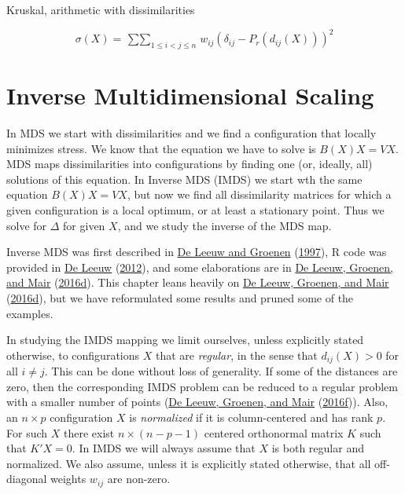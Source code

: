 \documentclass[
  12pt,
]{book}
\theoremstyle{definition}
\theoremstyle{definition}
\theoremstyle{definition}
\theoremstyle{definition}
\theoremstyle{remark}
\begin{document}
Kruskal, arithmetic with dissimilarities

\[
\sigma(X)=\mathop{\sum\sum}_{1\leq i<j\leq n}w_{ij}(\delta_{ij}-P_r(d_{ij}(X)))^2
\]

\hypertarget{inverse-multidimensional-scaling}{%
\chapter{Inverse Multidimensional Scaling}\label{inverse-multidimensional-scaling}}

In MDS we start with dissimilarities and we find a configuration that locally minimizes stress. We know that the equation we have to solve is \(B(X)X=VX\). MDS maps dissimilarities into configurations by finding one (or, ideally, all) solutions of this equation. In Inverse MDS (IMDS) we start wth the same equation
\(B(X)X=VX\), but now we find all dissimilarity matrices for which a given configuration is a local optimum, or at least a stationary point. Thus we solve for \(\Delta\) for given \(X\), and we study the inverse of the MDS map.

Inverse MDS was first described in \protect\hyperlink{ref-deleeuw_groenen_A_97}{De Leeuw and Groenen} (\protect\hyperlink{ref-deleeuw_groenen_A_97}{1997}), R code was provided in \protect\hyperlink{ref-deleeuw_U_12b}{De Leeuw} (\protect\hyperlink{ref-deleeuw_U_12b}{2012}), and some elaborations are in \protect\hyperlink{ref-deleeuw_groenen_mair_E_16f}{De Leeuw, Groenen, and Mair} (\protect\hyperlink{ref-deleeuw_groenen_mair_E_16f}{2016d}). This chapter leans heavily on \protect\hyperlink{ref-deleeuw_groenen_mair_E_16f}{De Leeuw, Groenen, and Mair} (\protect\hyperlink{ref-deleeuw_groenen_mair_E_16f}{2016d}), but we have reformulated some results and pruned some of the examples.

In studying the IMDS mapping we limit ourselves, unless explicitly stated otherwise, to configurations \(X\) that are \emph{regular}, in the sense that \(d_{ij}(X)>0\) for all \(i\not= j\).
This can be done without loss of generality. If some of the distances are zero, then the corresponding IMDS problem can be reduced to a regular problem with a smaller number of points (\protect\hyperlink{ref-deleeuw_groenen_mair_E_16g}{De Leeuw, Groenen, and Mair} (\protect\hyperlink{ref-deleeuw_groenen_mair_E_16g}{2016f})). Also, an \(n\times p\) configuration \(X\) is \emph{normalized} if it is column-centered and has rank \(p\). For such \(X\) there exist \(n\times (n-p-1)\) centered orthonormal matrix \(K\) such that \(K'X=0\). In IMDS we will always assume that \(X\) is both regular and normalized. We also assume, unless it is explicitly stated otherwise, that all off-diagonal weights \(w_{ij}\) are non-zero.
\end{document}

